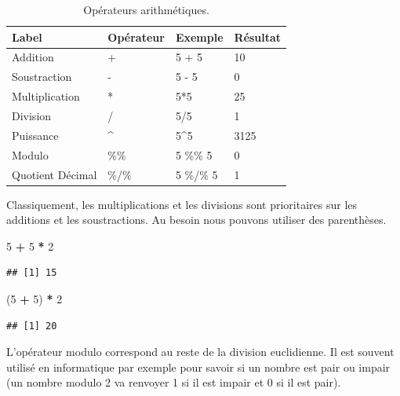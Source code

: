 \documentclass[
]{book}
\newenvironment{Shaded}{\begin{snugshade}}{\end{snugshade}}
\newcommand{\DecValTok}[1]{\textcolor[rgb]{0.00,0.00,0.81}{#1}}
\newcommand{\NormalTok}[1]{#1}
\newcommand{\OperatorTok}[1]{\textcolor[rgb]{0.81,0.36,0.00}{\textbf{#1}}}
\newcommand{\StringTok}[1]{\textcolor[rgb]{0.31,0.60,0.02}{#1}}
\begin{document}
\begin{table}

\caption{\label{tab:tabOpAri}Opérateurs arithmétiques.\label{tab:tabOpAri}}
\centering
\begin{tabular}[t]{l|l|l|l}
\hline
Label & Opérateur & Exemple & Résultat\\
\hline
Addition & + & 5 + 5 & 10\\
\hline
Soustraction & - & 5 - 5 & 0\\
\hline
Multiplication & * & 5*5 & 25\\
\hline
Division & / & 5/5 & 1\\
\hline
Puissance & \textasciicircum{} & 5\textasciicircum{}5 & 3125\\
\hline
Modulo & \%\% & 5 \%\% 5 & 0\\
\hline
Quotient Décimal & \%/\% & 5 \%/\% 5 & 1\\
\hline
\end{tabular}
\end{table}

Classiquement, les multiplications et les divisions sont prioritaires sur les additions et les soustractions. Au besoin nous pouvons utiliser des parenthèses.

\begin{Shaded}
\begin{Highlighting}[]
\DecValTok{5} \OperatorTok{+}\StringTok{ }\DecValTok{5} \OperatorTok{*}\StringTok{ }\DecValTok{2}
\end{Highlighting}
\end{Shaded}

\begin{verbatim}
## [1] 15
\end{verbatim}

\begin{Shaded}
\begin{Highlighting}[]
\NormalTok{(}\DecValTok{5} \OperatorTok{+}\StringTok{ }\DecValTok{5}\NormalTok{) }\OperatorTok{*}\StringTok{ }\DecValTok{2}
\end{Highlighting}
\end{Shaded}

\begin{verbatim}
## [1] 20
\end{verbatim}

L'opérateur modulo correspond au reste de la division euclidienne. Il est souvent utilisé en informatique par exemple pour savoir si un nombre est pair ou impair (un nombre modulo 2 va renvoyer 1 si il est impair et 0 si il est pair).
\end{document}
